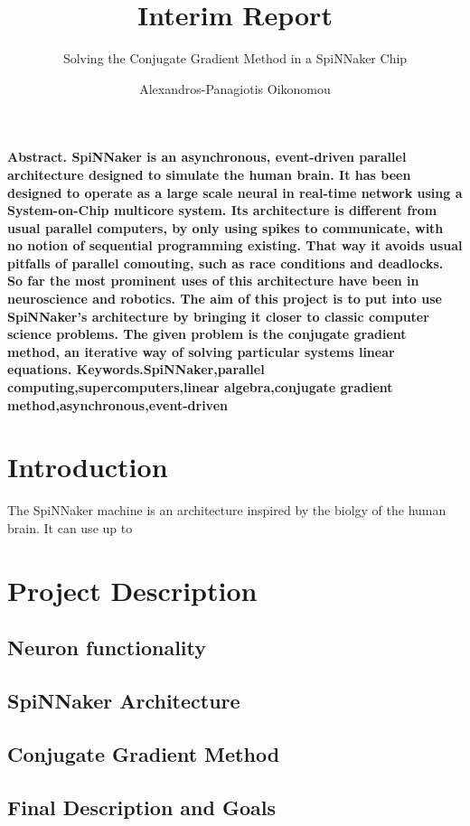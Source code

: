 \documentclass[12pt,a4paper,twocolumn]{scrartcl}
\author{Alexandros-Panagiotis Oikonomou}
\title{Interim Report}
\subtitle{Solving the Conjugate Gradient Method in a SpiNNaker Chip}
\begin{document}
\maketitle
\newpage
\thispagestyle{empty}
\mbox{}
\newpage
\thispagestyle{empty}
\mbox{}
\newpage
\thispagestyle{empty}
\mbox{}
\bf{Abstract. SpiNNaker is an asynchronous, event-driven parallel architecture designed to simulate the human brain. It has been designed to operate as a large scale neural in real-time network using a System-on-Chip multicore system. Its architecture is different from usual parallel computers, by only using	spikes to communicate, with no notion of sequential programming existing. That way it avoids usual pitfalls of parallel comouting, such as race conditions and deadlocks.  So far the most prominent uses of this architecture have been in neuroscience and robotics. The aim of this project is to put into use SpiNNaker's architecture by bringing it closer to classic computer science problems. The given problem is the conjugate gradient method, an iterative way of solving particular systems linear equations.}
\newline
\newline
\bf{Keywords.}\textnormal{SpiNNaker,parallel computing,supercomputers,linear algebra,conjugate gradient method,asynchronous,event-driven}
\section{Introduction}
\textnormal{
The SpiNNaker machine is an architecture inspired by the biolgy of the human brain. It can use up to\cite{Furber}} 
\section{Project Description}
\subsection{Neuron functionality}
\subsection{SpiNNaker Architecture}
\subsection{Conjugate Gradient Method}
\subsection{Final Description and Goals}
\end{document}
